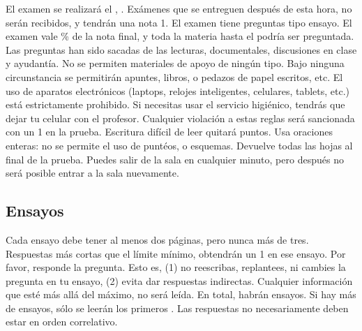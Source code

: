 \documentclass{article}
\begin{document}
El examen se realizar\'a el \underline{{\unskip}}, {\unskip}. Ex\'amenes que se entreguen despu\'es de esta hora, no ser\'an recibidos, y tendr\'an una nota 1. El examen tiene {\unskip} preguntas tipo ensayo. El examen vale {\unskip}\% de la nota final, y toda la materia hasta el {\unskip} podr\'ia ser preguntada. Las preguntas han sido sacadas de las lecturas, documentales, discusiones en clase y ayudant\'ia. No se permiten materiales de apoyo de ning\'un tipo. Bajo ninguna circunstancia se permitir\'an apuntes, libros, o pedazos de papel escritos, etc. El uso de aparatos electr\'onicos (laptops, relojes inteligentes, celulares, tablets, etc.) est\'a estrictamente prohibido. Si necesitas usar el servicio higi\'enico, tendr\'as que dejar tu celular con el profesor. Cualquier violaci\'on a estas reglas ser\'a sancionada con un 1 en la prueba.  Escritura dif\'icil de leer quitar\'a puntos. Usa oraciones enteras: no se permite el uso de punt\'eos, o esquemas. Devuelve todas las hojas al final de la prueba. Puedes salir de la sala en cualquier minuto, pero despu\'es no ser\'a posible entrar a la sala nuevamente. 


 

\subsection*{Ensayos}

Cada ensayo debe tener al menos dos p\'aginas, pero nunca m\'as de tres. Respuestas m\'as cortas que el l\'imite m\'inimo, obtendr\'an un 1 en ese ensayo. Por favor, responde la pregunta. Esto es, (1) no reescribas, replantees, ni cambies la pregunta en tu ensayo, (2) evita dar respuestas indirectas. Cualquier informaci\'on que est\'e m\'as all\'a del m\'aximo, no ser\'a le\'ida. En total, habr\'an {\unskip} ensayos. Si hay m\'as de {\unskip} ensayos, s\'olo se leer\'an los primeros {\unskip}. Las respuestas no necesariamente deben estar en orden correlativo.
\\
\end{document}
